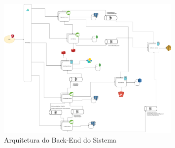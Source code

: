 \begin{figure}[h]
	\centering
	\includegraphics[width=0.8\textwidth]{figuras/campuscrib-diagram-system-design-macro.drawio.png}
	\caption{Arquitetura do Back-End do Sistema}
	\label{figura-arquitetura-campus}
\end{figure}



